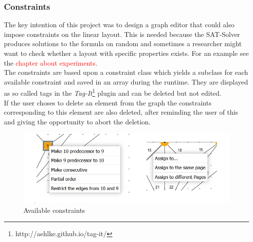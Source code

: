 \subsubsection{Constraints}
\label{imp_constr}
The key intention of this project was to design a graph editor that could also impose constraints on the linear layout. This is needed because the SAT-Solver produces solutions to the formula on random and sometimes a researcher might want to check whether a layout with specific properties exists. For an example see the \textcolor{red}{chapter about experiments}.\\
The constraints are based upon a constraint class which yields a subclass for each available constraint and saved in an array during the runtime. They are displayed as so called tags in the \textit{Tag-It}\footnote{http://aehlke.github.io/tag-it/} plugin and can be deleted but not edited.\\
If the user choses to delete an element from the graph the constraints corresponding to this element are also deleted, after reminding the user of this and giving the opportunity to abort the deletion.
\begin{figure}[!h]
\begin{center}
\includegraphics[width=\textwidth]{figures/figIndex/constraints.jpg}
\caption{Available constraints}
\label{img:constraints}
\end{center}
\end{figure}
